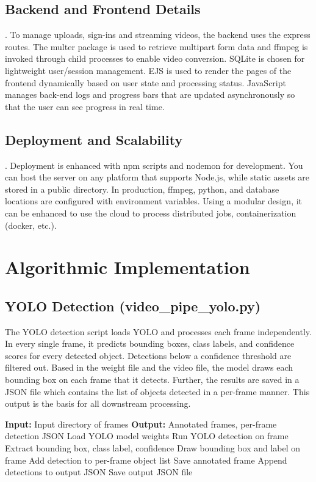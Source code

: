 \documentclass[12pt,a4paper]{report}
\theoremstyle{definition}
\theoremstyle{remark}
\begin{document}
\subsection{Backend and Frontend Details}.
To manage uploads, sign-ins and streaming videos, the backend uses the express routes. The multer package is used to retrieve multipart form data and ffmpeg is invoked through child processes to enable video conversion.  SQLite is chosen for lightweight user/session management. EJS is used to render the pages of the frontend dynamically based on user state and processing status. JavaScript manages back-end logs and progress bars that are updated asynchronously so that the user can see progress in real time.

\subsection{Deployment and Scalability}.
Deployment is enhanced with npm scripts and nodemon for development. You can host the server on any platform that supports Node.js, while static assets are stored in a public directory. In production, ffmpeg, python, and database locations are configured with environment variables. Using a modular design, it can be enhanced to use the cloud to process distributed jobs, containerization (docker, etc.).



\section{Algorithmic Implementation}
\subsection{YOLO Detection (video\_pipe\_yolo.py)}
The YOLO detection script loads YOLO and processes each frame independently. In every single frame, it predicts bounding boxes, class labels, and confidence scores for every detected object. Detections below a confidence threshold are filtered out. Based in the weight file and the video file, the model draws each bounding box on each frame that it detects. Further, the results are saved in a JSON file which contains the list of objects detected in a per-frame manner.  This output is the basis for all downstream processing.

\begin{algorithm}[h]
\caption{YOLOv11n Detection Pipeline}
\label{alg:yolo}
\begin{algorithmic}[1]
\State \textbf{Input:} Input directory of frames
\State \textbf{Output:} Annotated frames, per-frame detection JSON
\State Load YOLO model weights
    \State Run YOLO detection on frame
        \State Extract bounding box, class label, confidence
        \State Draw bounding box and label on frame
        \State Add detection to per-frame object list
    \EndFor
    \State Save annotated frame
    \State Append detections to output JSON
\EndFor
\State Save output JSON file
\end{algorithmic}
\end{algorithm}
\end{document}

